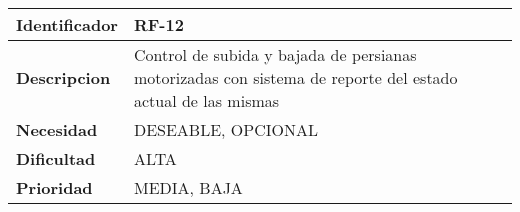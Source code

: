 \begin{center}
    \begin{tabular}{|p{2.6cm}|p{12cm}|}
    \hline
    \textbf{Identificador} & RF-12\\
    \hline
    \textbf{Descripcion} & Control de subida y bajada de persianas motorizadas con sistema de reporte del estado actual de las mismas\\
    \hline
    \textbf{Necesidad} & DESEABLE, OPCIONAL\\
    \hline
    \textbf{Dificultad} & ALTA\\
    \hline
    \textbf{Prioridad} & MEDIA, BAJA\\
    \hline
    \end{tabular}
\end{center}
